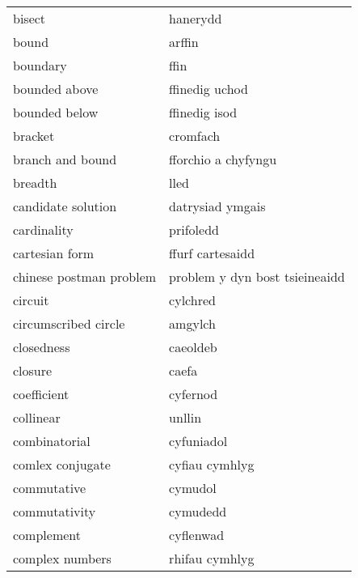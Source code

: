 \begin{supertabular}{p{0.22\textwidth}p{0.22\textwidth}}
                           bisect &                         hanerydd \\
                            bound &                           arffin \\
                         boundary &                             ffin \\
                    bounded above &                   ffinedig uchod \\
                    bounded below &                    ffinedig isod \\
                          bracket &                         cromfach \\
                 branch and bound &              fforchio a chyfyngu \\
                          breadth &                             lled \\
               candidate solution &                 datrysiad ymgais \\
                      cardinality &                        prifoledd \\
                   cartesian form &                 ffurf cartesaidd \\
          chinese postman problem &   problem y dyn bost tsieineaidd \\
                          circuit &                         cylchred \\
             circumscribed circle &                          amgylch \\
                       closedness &                         caeoldeb \\
                          closure &                            caefa \\
                      coefficient &                         cyfernod \\
                        collinear &                           unllin \\
                    combinatorial &                       cyfuniadol \\
                 comlex conjugate &                   cyfiau cymhlyg \\
                      commutative &                          cymudol \\
                    commutativity &                         cymudedd \\
                       complement &                        cyflenwad \\
                  complex numbers &                   rhifau cymhlyg \\

\end{supertabular}
